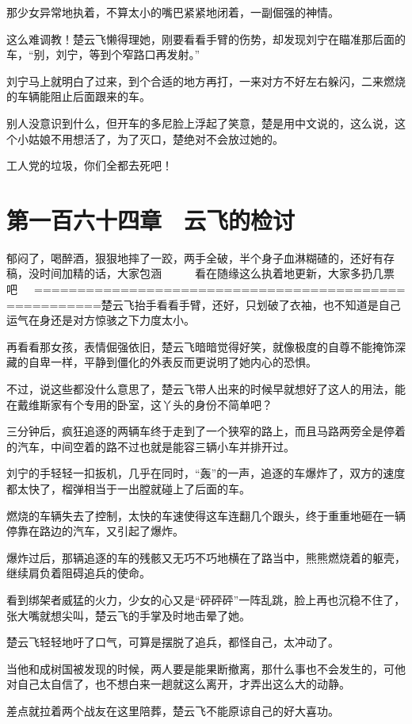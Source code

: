 那少女异常地执着，不算太小的嘴巴紧紧地闭着，一副倔强的神情。

这么难调教！楚云飞懒得理她，刚要看看手臂的伤势，却发现刘宁在瞄准那后面的车，“别，刘宁，等到个窄路口再发射。”

刘宁马上就明白了过来，到个合适的地方再打，一来对方不好左右躲闪，二来燃烧的车辆能阻止后面跟来的车。

别人没意识到什么，但开车的多尼脸上浮起了笑意，楚是用中文说的，这么说，这个小姑娘不用想活了，为了灭口，楚绝对不会放过她的。

工人党的垃圾，你们全都去死吧！

\section{第一百六十四章　云飞的检讨}

郁闷了，喝醉酒，狠狠地摔了一跤，两手全破，半个身子血淋糊碴的，还好有存稿，没时间加精的话，大家包涵~~~~~~看在随缘这么执着地更新，大家多扔几票吧~~~======================================================楚云飞抬手看看手臂，还好，只划破了衣袖，也不知道是自己运气在身还是对方惊骇之下力度太小。

再看看那女孩，表情倔强依旧，楚云飞暗暗觉得好笑，就像极度的自尊不能掩饰深藏的自卑一样，平静到僵化的外表反而更说明了她内心的恐惧。

不过，说这些都没什么意思了，楚云飞带人出来的时候早就想好了这人的用法，能在戴维斯家有个专用的卧室，这丫头的身份不简单吧？

三分钟后，疯狂追逐的两辆车终于走到了一个狭窄的路上，而且马路两旁全是停着的汽车，中间空着的路不过也就是能容三辆小车并排开过。

刘宁的手轻轻一扣扳机，几乎在同时，“轰”的一声，追逐的车爆炸了，双方的速度都太快了，榴弹相当于一出膛就碰上了后面的车。

燃烧的车辆失去了控制，太快的车速使得这车连翻几个跟头，终于重重地砸在一辆停靠在路边的汽车，又引起了爆炸。

爆炸过后，那辆追逐的车的残骸又无巧不巧地横在了路当中，熊熊燃烧着的躯壳，继续肩负着阻碍追兵的使命。

看到绑架者威猛的火力，少女的心又是“砰砰砰”一阵乱跳，脸上再也沉稳不住了，张大嘴就想尖叫，楚云飞的手掌及时地击晕了她。

楚云飞轻轻地吁了口气，可算是摆脱了追兵，都怪自己，太冲动了。

当他和成树国被发现的时候，两人要是能果断撤离，那什么事也不会发生的，可他对自己太自信了，也不想白来一趟就这么离开，才弄出这么大的动静。

差点就拉着两个战友在这里陪葬，楚云飞不能原谅自己的好大喜功。

